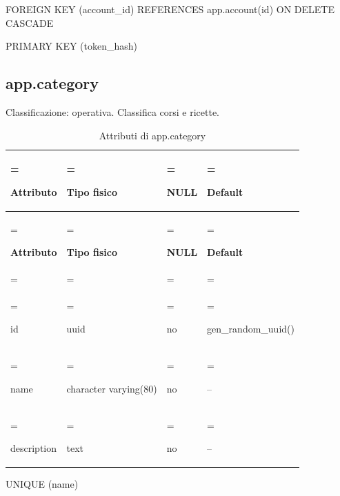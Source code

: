 \documentclass[11pt,a4paper]{article}
\begin{document}
{\ttfamily\small FOREIGN KEY (\allowbreak{}account\_\allowbreak{}id) REFERENCES app.\allowbreak{}account(\allowbreak{}id) ON DELETE CASCADE}\par

{\ttfamily\small PRIMARY KEY (\allowbreak{}token\_\allowbreak{}hash)}\par

\subsection{app.category}

Classificazione: operativa. Classifica corsi e ricette.

{\small \renewcommand{\arraystretch}{1.2}

\begin{xltabular}{\linewidth}{>{\hsize\linewidth=\hsize\raggedright\arraybackslash}X>{\hsize\linewidth=\hsize\raggedright\arraybackslash}X>{\hsize\linewidth=\hsize\raggedright\arraybackslash}X>{\hsize\linewidth=\hsize\raggedright\arraybackslash}X}
\caption{Attributi di app.category}\label{tab:dictionary-8}\\
\toprule

\textbf{Attributo} & \textbf{Tipo fisico} & \textbf{NULL} & \textbf{Default}\\\midrule\endfirsthead\toprule\textbf{Attributo} & \textbf{Tipo fisico} & \textbf{NULL} & \textbf{Default}\\\midrule\endhead
\midrule{}\\\endfoot\bottomrule\endlastfoot


{\ttfamily\small id} & {\ttfamily\small uuid} & no & {\ttfamily\small gen\_\allowbreak{}random\_\allowbreak{}uuid(\allowbreak{})}\\\addlinespace[3pt]

{\ttfamily\small name} & {\ttfamily\small character varying(\allowbreak{}80)} & no & {\ttfamily\small --}\\\addlinespace[3pt]

{\ttfamily\small description} & {\ttfamily\small text} & no & {\ttfamily\small --}\\*

\end{xltabular}}

{\ttfamily\small UNIQUE (\allowbreak{}name)}\par
\end{document}
